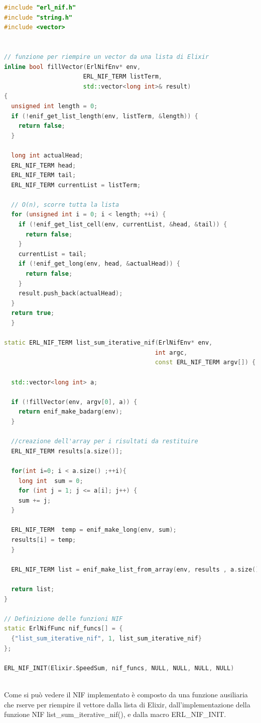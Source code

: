 \begin{lstlisting}[language=cpp,captionpos=b,
	caption={Funzione NIF},
	label={lst:list_sum_nif}]
#include "erl_nif.h" 
#include "string.h"
#include <vector>
	
	
// funzione per riempire un vector da una lista di Elixir
inline bool fillVector(ErlNifEnv* env,
                      ERL_NIF_TERM listTerm,
                      std::vector<long int>& result) 
{
  unsigned int length = 0;
  if (!enif_get_list_length(env, listTerm, &length)) {
    return false;
  }
	
  long int actualHead; 
  ERL_NIF_TERM head;
  ERL_NIF_TERM tail;
  ERL_NIF_TERM currentList = listTerm;
	
  // O(n), scorre tutta la lista
  for (unsigned int i = 0; i < length; ++i) {
    if (!enif_get_list_cell(env, currentList, &head, &tail)) {
      return false;
    }
    currentList = tail;
    if (!enif_get_long(env, head, &actualHead)) {
      return false;
    }
    result.push_back(actualHead);
  }
  return true;
  }
	
static ERL_NIF_TERM list_sum_iterative_nif(ErlNifEnv* env,
                                          int argc,
                                          const ERL_NIF_TERM argv[]) {
	
  std::vector<long int> a;
	
  if (!fillVector(env, argv[0], a)) {
    return enif_make_badarg(env);
  }
	
  //creazione dell'array per i risultati da restituire
  ERL_NIF_TERM results[a.size()];
	
  for(int i=0; i < a.size() ;++i){
    long int  sum = 0;
    for (int j = 1; j <= a[i]; j++) {
    sum += j;
  }

  ERL_NIF_TERM  temp = enif_make_long(env, sum);
  results[i] = temp;
  }

  ERL_NIF_TERM list = enif_make_list_from_array(env, results , a.size());
	
  return list;
}
	
// Definizione delle funzioni NIF
static ErlNifFunc nif_funcs[] = {
  {"list_sum_iterative_nif", 1, list_sum_iterative_nif}
};

ERL_NIF_INIT(Elixir.SpeedSum, nif_funcs, NULL, NULL, NULL, NULL)
	
\end{lstlisting}

Come si può vedere il NIF implementato è composto da una funzione
ausiliaria che rserve per riempire il vettore dalla lista di Elixir,
dall'implementazione della funzione NIF list\_sum\_iterative\_nif(),
e dalla macro ERL\_NIF\_INIT.

